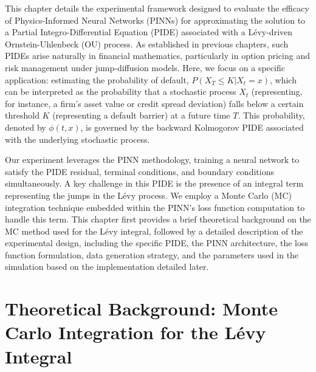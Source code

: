 \documentclass[11pt,twoside,openright]{report}
\begin{document}
This chapter details the experimental framework designed to evaluate the efficacy of Physics-Informed Neural Networks (PINNs) for approximating the solution to a Partial Integro-Differential Equation (PIDE) associated with a Lévy-driven Ornstein-Uhlenbeck (OU) process. As established in previous chapters, such PIDEs arise naturally in financial mathematics, particularly in option pricing and risk management under jump-diffusion models. Here, we focus on a specific application: estimating the probability of default, $P(X_{T} \le K | X_t = x)$, which can be interpreted as the probability that a stochastic process $X_t$ (representing, for instance, a firm's asset value or credit spread deviation) falls below a certain threshold $K$ (representing a default barrier) at a future time $T$. This probability, denoted by $\phi(t, x)$, is governed by the backward Kolmogorov PIDE associated with the underlying stochastic process.

Our experiment leverages the PINN methodology, training a neural network to satisfy the PIDE residual, terminal conditions, and boundary conditions simultaneously. A key challenge in this PIDE is the presence of an integral term representing the jumps in the Lévy process. We employ a Monte Carlo (MC) integration technique embedded within the PINN's loss function computation to handle this term. This chapter first provides a brief theoretical background on the MC method used for the Lévy integral, followed by a detailed description of the experimental design, including the specific PIDE, the PINN architecture, the loss function formulation, data generation strategy, and the parameters used in the simulation based on the implementation detailed later.

\section{Theoretical Background: Monte Carlo Integration for the Lévy Integral}
\label{sec:mc_background}
\end{document}
